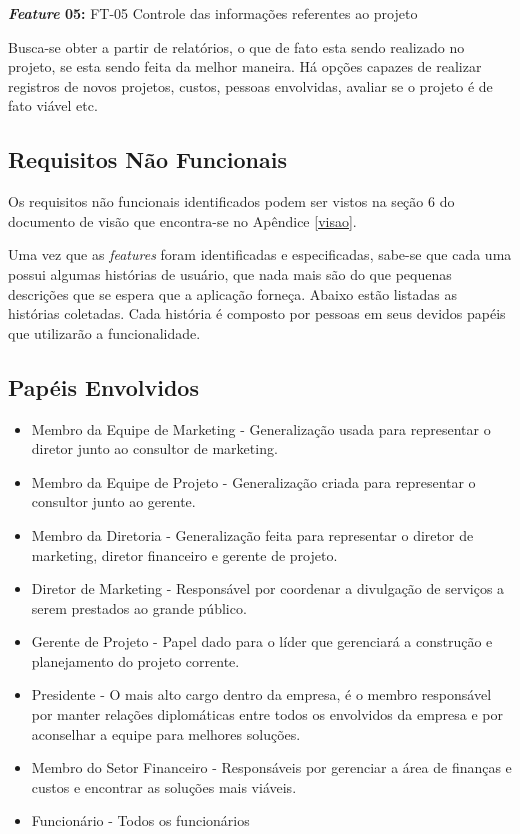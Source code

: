 \textbf{\textit{Feature} 05:} FT-05 Controle das informações referentes ao projeto

Busca-se obter a partir de relatórios, o que de fato esta sendo realizado no projeto, se esta sendo feita da melhor maneira. Há opções capazes de realizar registros de novos projetos, custos, pessoas envolvidas, avaliar se o projeto é de fato viável etc.

\subsection{Requisitos Não Funcionais}
Os requisitos não funcionais identificados podem ser vistos na seção 6 do documento de visão que encontra-se no Apêndice \ref{visao}.

Uma vez que as \textit{features} foram identificadas e especificadas, sabe-se que cada uma possui algumas histórias de usuário, que nada mais são do que pequenas descrições que se espera que a aplicação forneça. Abaixo estão listadas as histórias coletadas. Cada história é composto por pessoas em seus devidos papéis que utilizarão a funcionalidade.

\subsection{Papéis Envolvidos}\begin{itemize}
\item Membro da Equipe de Marketing - Generalização usada para representar o diretor junto ao consultor de marketing.

\item Membro da Equipe de Projeto - Generalização criada para representar o consultor junto ao gerente.

\item Membro da Diretoria - Generalização feita para representar o diretor de marketing, diretor financeiro e gerente de projeto.

\item Diretor de Marketing - Responsável por coordenar a divulgação de serviços a serem prestados ao grande público.

\item Gerente de Projeto - Papel dado para o líder que gerenciará a construção e planejamento do projeto corrente.

\item Presidente - O mais alto cargo dentro da empresa, é o membro responsável por manter relações diplomáticas entre todos os envolvidos da empresa e por aconselhar a equipe para melhores soluções.

\item Membro do Setor Financeiro - Responsáveis por gerenciar a área de finanças e custos e encontrar as soluções mais viáveis. 

\item Funcionário - Todos os funcionários
\end{itemize}

